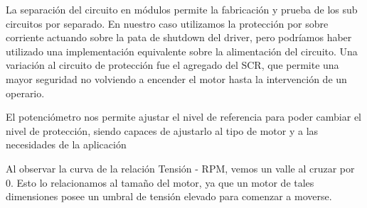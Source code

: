 \documentclass[11pt, a4paper]{article}
\begin{document}
La separación del circuito en módulos permite la fabricación y prueba de los sub circuitos por separado. En nuestro caso utilizamos la protección por sobre corriente actuando sobre la pata de shutdown del driver, pero podríamos haber utilizado una implementación equivalente sobre la alimentación del circuito. Una variación al circuito de protección fue el agregado del SCR, que permite una mayor seguridad no volviendo a encender el motor hasta la intervención de un operario.

El potenciómetro nos permite ajustar el nivel de referencia para poder cambiar el nivel de protección, siendo capaces de ajustarlo al tipo de motor y a las necesidades de la aplicación

Al observar la curva de la relación Tensión - RPM, vemos un valle al cruzar por 0. Esto lo relacionamos al tamaño del motor, ya que un motor de tales dimensiones posee un umbral de tensión elevado para comenzar a moverse.
\end{document}
